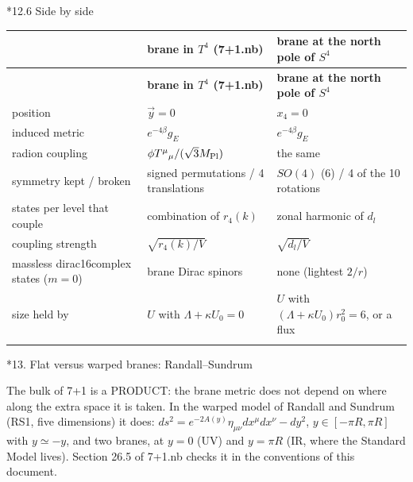 \documentclass[10pt,a4paper]{article}
\makeatletter
\renewcommand\section{\@startsection{section}{1}{\z@}{-3.5ex \@plus -1ex \@minus -.2ex}{2.3ex \@plus.2ex}{\normalfont\Large\bfseries\raggedright}}
\renewcommand\subsection{\@startsection{subsection}{2}{\z@}{-3.25ex\@plus -1ex \@minus -.2ex}{1.5ex \@plus .2ex}{\normalfont\large\bfseries\raggedright}}
\makeatother
\begin{document}
\subsection*{12.6 Side by side}
{\footnotesize
\begin{longtable}{>{\raggedright\arraybackslash}p{}>{\raggedright\arraybackslash}p{}>{\raggedright\arraybackslash}p{}}
\toprule
\textbf{} & \textbf{brane in $T^4$ (7+1.nb)} & \textbf{brane at the north pole of $S^4$} \\
\midrule\endfirsthead
\toprule
\textbf{} & \textbf{brane in $T^4$ (7+1.nb)} & \textbf{brane at the north pole of $S^4$} \\
\midrule\endhead
\endfoot
\bottomrule\endlastfoot
position & $\vec y=0$ & $x_4=0$ \\
induced metric & $e^{-4\beta}g_E$ & $e^{-4\beta}g_E$ \\
radion coupling & $\phi T^\mu{}_\mu/(\sqrt3M_{\rm Pl})$ & the same \\
symmetry kept / broken & 384 signed permutations / 4 translations & $SO(4)$ (6) / 4 of the 10 rotations \\
states per level that couple & 1 combination of $r_4(k)$ & 1 zonal harmonic of $d_l$ \\
coupling strength & $\sqrt{r_4(k)/V}$ & $\sqrt{d_l/V}$ \\
massless dirac16complex states ($m=0$) & 4 brane Dirac spinors & none (lightest $2/r$) \\
size held by & $U$ with $\Lambda+\kappa U_0=0$ & $U$ with $(\Lambda+\kappa U_0)r_0^2=6$, or a flux \\*
\end{longtable}}
\section*{13. Flat versus warped branes: Randall–Sundrum}
The bulk of 7+1 is a PRODUCT: the brane metric does not depend on where along the extra space it is taken. In the warped model of Randall and Sundrum (RS1, five dimensions) it does: $ds^2=e^{-2A(y)}\eta_{\mu\nu}dx^\mu dx^\nu-dy^2$, $y\in[-\pi R,\pi R]$ with $y\simeq-y$, and two branes, at $y=0$ (UV) and $y=\pi R$ (IR, where the Standard Model lives). Section 26.5 of 7+1.nb checks it in the conventions of this document.
\end{document}
